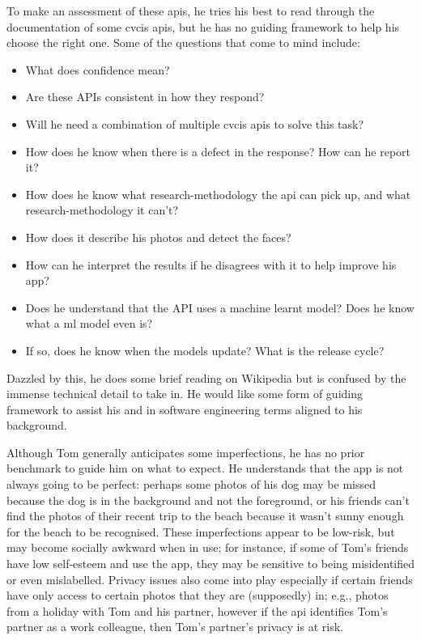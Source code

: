 

To make an assessment of these \glspl{api}, he tries his best to read through the documentation of some \gls{cvcis} \glspl{api}, but he has no guiding framework to help his choose the right one. Some of the questions that come to mind include:

\begin{itemize}
  \item What does confidence mean? 
  \item Are these APIs consistent in how they respond?
  \item Will he need a combination of multiple \gls{cvcis} \glspl{api} to solve this task?
  \item How does he know when there is a defect in the response? How can he report it?
  \item How does he know what research-methodology the \gls{api} can pick up, and what research-methodology it can't?
  \item How does it describe his photos and detect the faces?
  \item How can he interpret the results if he disagrees with it to help improve his app?
  \item Does he understand that the API uses a machine learnt model? Does he know what a \gls{ml} model even is?
  \item If so, does he know when the models update? What is the release cycle?
\end{itemize}

Dazzled by this, he does some brief reading on Wikipedia but is confused by the immense technical detail to take in. He would like some form of guiding framework to assist his and in software engineering terms aligned to his background.

Although Tom generally anticipates some imperfections, he has no prior benchmark to guide him on what to expect. He understands that the app is not always going to be perfect: perhaps some photos of his dog may be missed because the dog is in the background and not the foreground, or his friends can't find the photos of their recent trip to the beach because it wasn't sunny enough for the beach to be recognised. These imperfections appear to be low-risk, but may become socially awkward when in use; for instance, if some of Tom's friends have low self-esteem and use the app, they may be sensitive to being misidentified or even mislabelled. Privacy issues also come into play especially if certain friends have only access to certain photos that they are (supposedly) in; e.g., photos from a holiday with Tom and his partner, however if the \gls{api} identifies Tom's partner as a work colleague, then Tom's partner's privacy is at risk.

